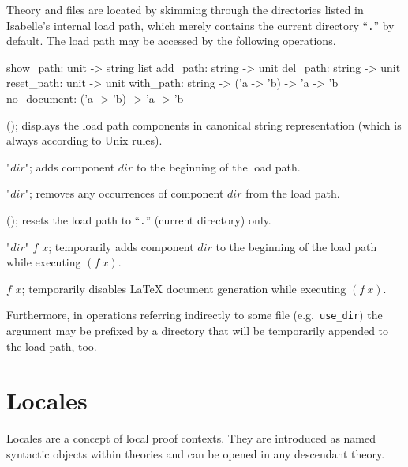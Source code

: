 \medskip Theory and {\ML} files are located by skimming through the
directories listed in Isabelle's internal load path, which merely contains the
current directory ``\texttt{.}'' by default.  The load path may be accessed by
the following operations.

\begin{ttbox}
show_path: unit -> string list
add_path: string -> unit
del_path: string -> unit
reset_path: unit -> unit
with_path: string -> ('a -> 'b) -> 'a -> 'b
no_document: ('a -> 'b) -> 'a -> 'b
\end{ttbox}

\begin{ttdescription}
\item[\ttindexbold{show_path}();] displays the load path components in
  canonical string representation (which is always according to Unix rules).
  
\item[\ttindexbold{add_path} "$dir$";] adds component $dir$ to the beginning
  of the load path.
  
\item[\ttindexbold{del_path} "$dir$";] removes any occurrences of component
  $dir$ from the load path.
  
\item[\ttindexbold{reset_path}();] resets the load path to ``\texttt{.}''
  (current directory) only.
  
\item[\ttindexbold{with_path} "$dir$" $f$ $x$;] temporarily adds component
  $dir$ to the beginning of the load path while executing $(f~x)$.
  
\item[\ttindexbold{no_document} $f$ $x$;] temporarily disables {\LaTeX}
  document generation while executing $(f~x)$.

\end{ttdescription}

Furthermore, in operations referring indirectly to some file (e.g.\ 
\texttt{use_dir}) the argument may be prefixed by a directory that will be
temporarily appended to the load path, too.


\section{Locales}
\label{Locales}

Locales \cite{kammueller-locales} are a concept of local proof contexts.  They
are introduced as named syntactic objects within theories and can be
opened in any descendant theory.

